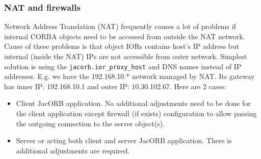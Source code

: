 \subsubsection{NAT and firewalls}
Network Address Translation (NAT) frequently causes a lot of problems if internal CORBA objects need to be accessed from outside the NAT network.
Cause of these problems is that object IORs contains host's IP address but internal (inside the NAT) IPs are not accessible from outer network.
Simplest solution is using the {\tt jacorb.ior\_proxy\_host} and DNS names instead of IP addresses.
E.g. we have the 192.168.10.* network managed by NAT. Its gateway has inner IP: 192.168.10.1 and outer IP: 10.30.102.67.
Here are 2 cases:
\begin{itemize}
\item Client JacORB application. No additional adjustments need to be done for the client application except firewall
(if exists) configuration to allow passing the outgoing connection to the server object(s).
\item Server or acting both client and server JacORB application. There is additional adjustments are required.
\end{itemize}


